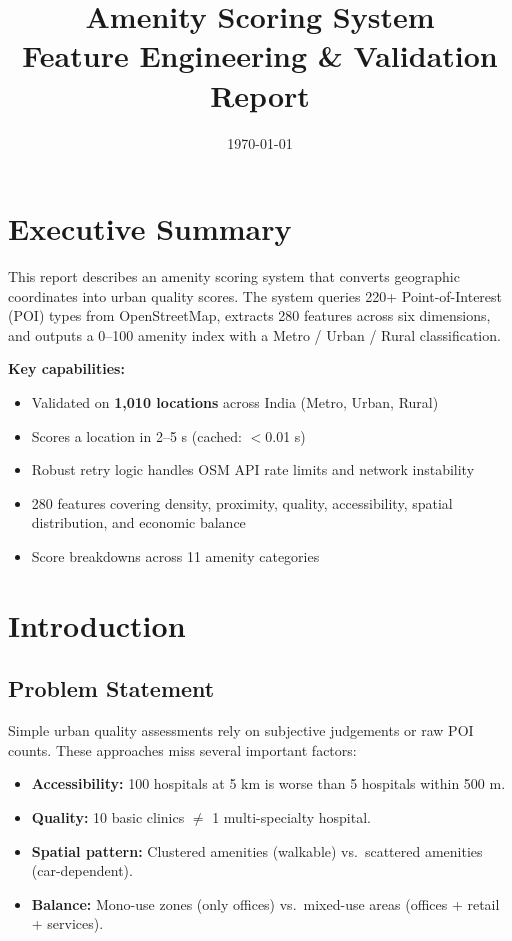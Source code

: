 \documentclass[11pt,a4paper]{article}
\title{\textbf{Amenity Scoring System}\\[4pt]
       \large Feature Engineering \& Validation Report}
\author{}
\date{\today}
\begin{document}
\maketitle

\section{Executive Summary}

This report describes an amenity scoring system that converts geographic coordinates into urban quality scores. The system queries 220+ Point-of-Interest (POI) types from OpenStreetMap, extracts 280 features across six dimensions, and outputs a 0--100 amenity index with a Metro / Urban / Rural classification.

\medskip
\noindent\textbf{Key capabilities:}
\begin{itemize}
  \item Validated on \textbf{1,010 locations} across India (Metro, Urban, Rural)
  \item Scores a location in 2--5 s (cached: $<$0.01 s)
  \item Robust retry logic handles OSM API rate limits and network instability
  \item 280 features covering density, proximity, quality, accessibility, spatial distribution, and economic balance
  \item Score breakdowns across 11 amenity categories
\end{itemize}

\section{Introduction}

\subsection{Problem Statement}

Simple urban quality assessments rely on subjective judgements or raw POI counts. These approaches miss several important factors:

\begin{itemize}
  \item \textbf{Accessibility:} 100 hospitals at 5 km is worse than 5 hospitals within 500 m.
  \item \textbf{Quality:} 10 basic clinics $\neq$ 1 multi-specialty hospital.
  \item \textbf{Spatial pattern:} Clustered amenities (walkable) vs.\ scattered amenities (car-dependent).
  \item \textbf{Balance:} Mono-use zones (only offices) vs.\ mixed-use areas (offices + retail + services).
\end{itemize}
\end{document}
